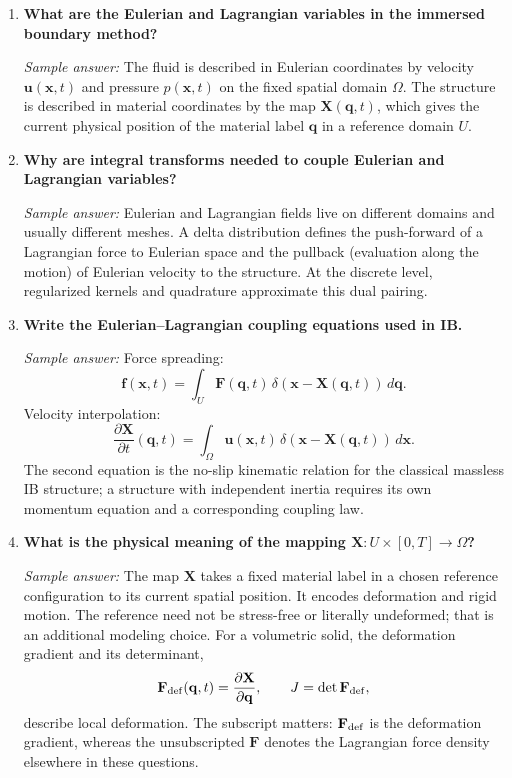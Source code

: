 \documentclass[11pt]{article}
\begin{document}
\begin{enumerate}[label=\arabic*.]

\item \textbf{What are the Eulerian and Lagrangian variables in the immersed boundary method?}

\textit{Sample answer:}  
The fluid is described in Eulerian coordinates by velocity
$\mathbf{u}(\mathbf{x},t)$ and pressure $p(\mathbf{x},t)$ on the fixed spatial
domain $\Omega$. The structure is described in material coordinates by the map
$\mathbf{X}(\mathbf{q},t)$, which gives the current physical position of
the material label $\mathbf{q}$ in a reference domain $U$.

\item \textbf{Why are integral transforms needed to couple Eulerian and Lagrangian variables?}

\textit{Sample answer:}  
Eulerian and Lagrangian fields live on different domains and usually different
meshes. A delta distribution defines the push-forward of a Lagrangian force to
Eulerian space and the pullback (evaluation along the motion) of Eulerian
velocity to the structure. At the discrete level, regularized kernels and
quadrature approximate this dual pairing.

\item \textbf{Write the Eulerian--Lagrangian coupling equations used in IB.}

\textit{Sample answer:}  
Force spreading:
\[
\mathbf{f}(\mathbf{x},t) = \int_U \mathbf{F}(\mathbf{q},t)\,
\delta\!\left(\mathbf{x}-\mathbf{X}(\mathbf{q},t)\right)\,d\mathbf{q}.
\]
Velocity interpolation:
\[
\frac{\partial \mathbf{X}}{\partial t}(\mathbf{q},t)
= \int_\Omega \mathbf{u}(\mathbf{x},t)\,
\delta\!\left(\mathbf{x}-\mathbf{X}(\mathbf{q},t)\right)\,d\mathbf{x}.
\]
The second equation is the no-slip kinematic relation for the classical
massless IB structure; a structure with independent inertia requires its own
momentum equation and a corresponding coupling law.

\item \textbf{What is the physical meaning of the mapping $\mathbf{X} : U \times [0,T] \to \Omega$?}

\textit{Sample answer:}
The map $\mathbf{X}$ takes a fixed material label in a chosen reference
configuration to its current spatial position. It encodes deformation and
rigid motion. The reference need not be stress-free or literally undeformed;
that is an additional modeling choice. For a volumetric solid, the deformation
gradient and its determinant,
\[
\mathbf{F}_{\rm def}(\mathbf{q},t)=\frac{\partial\mathbf{X}}{\partial\mathbf{q}},
\qquad
J=\det\mathbf{F}_{\rm def},
\]
describe local deformation. The subscript matters: $\mathbf{F}_{\rm def}$ is the
deformation gradient, whereas the unsubscripted $\mathbf{F}$ denotes the
Lagrangian force density elsewhere in these questions.


\end{enumerate}
\end{document}
